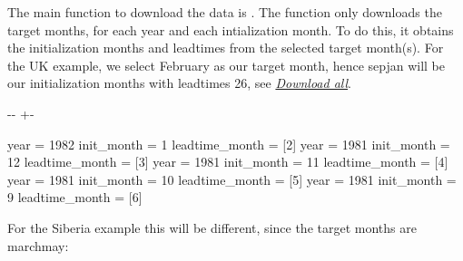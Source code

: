 \documentclass[letterpaper,10pt,english]{sphinxmanual}
\newlength\nbsphinxcodecellspacing
\begin{document}
The main function to download the data is . The function only downloads the target months, for each year and each intialization month. To do this, it obtains the initialization months and leadtimes from the selected target month(s). For the UK example, we select February as our target month, hence sep\sphinxhyphen{}jan will be our initialization months with leadtimes 2\sphinxhyphen{}6, see {\hyperref[\detokenize{Notebooks/1.Download/1.Retrieve:Download-all-data}]{\emph{Download all}}}.

{
\begin{sphinxVerbatim}[commandchars=\\\{\}]
\llap{\color{nbsphinxin}[7]:\,\hspace{\fboxrule}\hspace{\fboxsep}}\PYG{p}{[}\PYG{p}{]}
\end{sphinxVerbatim}
}

{

\kern-\sphinxverbatimsmallskipamount\kern-\baselineskip
\kern+\FrameHeightAdjust\kern-\fboxrule
\vspace{\nbsphinxcodecellspacing}

\begin{sphinxVerbatim}[commandchars=\\\{\}]
year = 1982 init\_month = 1 leadtime\_month = [2]
year = 1981 init\_month = 12 leadtime\_month = [3]
year = 1981 init\_month = 11 leadtime\_month = [4]
year = 1981 init\_month = 10 leadtime\_month = [5]
year = 1981 init\_month = 9 leadtime\_month = [6]
\end{sphinxVerbatim}
}

For the Siberia example this will be different, since the target months are march\sphinxhyphen{}may:

{
\begin{sphinxVerbatim}[commandchars=\\\{\}]
\llap{\color{nbsphinxin}[8]:\,\hspace{\fboxrule}\hspace{\fboxsep}}\PYG{p}{[}\PYG{p}{]}
\end{sphinxVerbatim}
}
\end{document}
